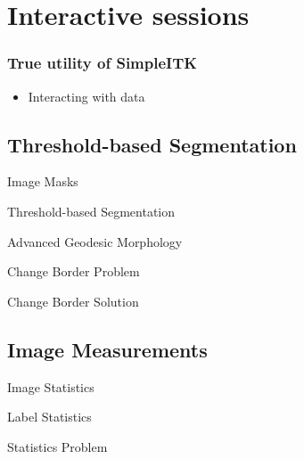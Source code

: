 \section{Interactive sessions}

%
%

\begin{frame}
\frametitle{True utility of SimpleITK}
\begin{itemize}
\item Interacting with data
\end{itemize}
\end{frame}

\subsection{Threshold-based Segmentation}

\begin{frame}{Image Masks}
\end{frame}

\begin{frame}{Threshold-based Segmentation}
\end{frame}


\begin{frame}{Advanced Geodesic Morphology}
\end{frame}

\begin{frame}{Change Border Problem}
\end{frame}

\begin{frame}{Change Border Solution}
\end{frame}


%
%

\subsection{Image Measurements}
\begin{frame}{Image Statistics}
\end{frame}

\begin{frame}{Label Statistics}
\end{frame}


\begin{frame}{Statistics Problem}
\end{frame}

